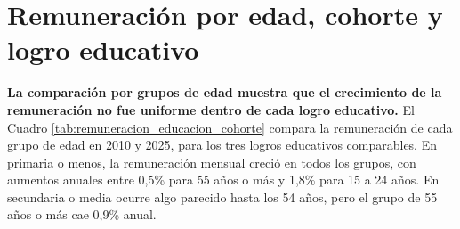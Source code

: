 



\iffalse
\section{Remuneración por edad, cohorte y logro educativo}\label{sec:cohortes_edad}

\textbf{La comparación por grupos de edad muestra que el crecimiento de la remuneración no fue uniforme dentro de cada logro educativo.} El Cuadro \ref{tab:remuneracion_educacion_cohorte} compara la remuneración de cada grupo de edad en 2010 y 2025, para los tres logros educativos comparables. En primaria o menos, la remuneración mensual creció en todos los grupos, con aumentos anuales entre 0,5\% para 55 años o más y 1,8\% para 15 a 24 años. En secundaria o media ocurre algo parecido hasta los 54 años, pero el grupo de 55 años o más cae 0,9\% anual.


